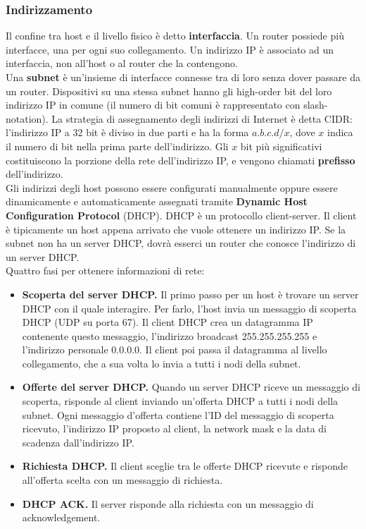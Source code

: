 \documentclass[11pt]{article}
\begin{document}
\subsubsection{Indirizzamento}
Il confine tra host e il livello fisico è detto \textbf{interfaccia}. Un router possiede più interfacce, una per ogni suo 
collegamento. Un indirizzo IP è associato ad un interfaccia, non all'host o al router che la contengono.\\        
Una \textbf{subnet} è un'insieme di interfacce connesse tra di loro senza dover passare da un router. Dispositivi su una  
stessa subnet hanno gli high-order bit del loro indirizzo IP in comune (il numero di bit comuni è rappresentato con slash-notation).
La strategia di assegnamento degli indirizzi di Internet è detta CIDR: l'indirizzo IP a 32 bit è diviso in due parti e ha 
la forma $a.b.c.d/x$, dove $x$ indica il numero di bit nella prima parte dell'indirizzo. Gli $x$ bit più significativi 
costituiscono la porzione della rete dell'indirizzo IP, e vengono chiamati \textbf{prefisso} dell'indirizzo.\\
Gli indirizzi degli host possono essere configurati manualmente oppure essere dinamicamente e automaticamente assegnati tramite 
\textbf{Dynamic Host Configuration Protocol} (DHCP). DHCP è un protocollo client-server. Il client è tipicamente un host 
appena arrivato che vuole ottenere un indirizzo IP. Se la subnet non ha un server DHCP, dovrà esserci un router che conosce 
l'indirizzo di un server DHCP.\\
Quattro fasi per ottenere informazioni di rete:
\begin{itemize}
    \item \textbf{Scoperta del server DHCP.} Il primo passo per un host è trovare un server DHCP con il quale interagire. 
    Per farlo, l'host invia un messaggio di scoperta DHCP (UDP su porta 67). Il client DHCP crea un datagramma IP contenente 
    questo messaggio, l'indirizzo broadcast 255.255.255.255 e l'indirizzo personale 0.0.0.0. Il client poi passa il datagramma 
    al livello collegamento, che a sua volta lo invia a tutti i nodi della subnet.
    \item \textbf{Offerte del server DHCP.} Quando un server DHCP riceve un messaggio di scoperta, risponde al client inviando 
    un'offerta DHCP a tutti i nodi della subnet. Ogni messaggio d'offerta contiene l'ID del messaggio di scoperta ricevuto, 
    l'indirizzo IP proposto al client, la network mask e la data di scadenza dall'indirizzo IP.
    \item \textbf{Richiesta DHCP.} Il client sceglie tra le offerte DHCP ricevute e risponde all'offerta scelta con un 
    messaggio di richiesta.
    \item \textbf{DHCP ACK.} Il server risponde alla richiesta con un messaggio di acknowledgement.
\end{itemize}
\end{document}
